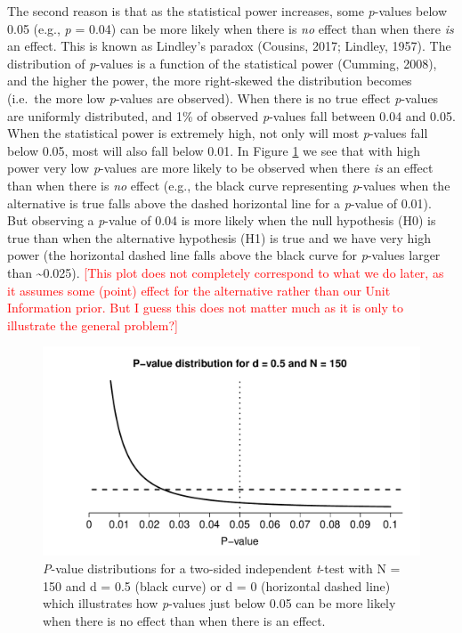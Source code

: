 \documentclass[
  english,
  ,jou, a4paper,floatsintext]{apa6}
\begin{document}
The second reason is that as the statistical power increases, some \emph{p}-values below 0.05 (e.g., \emph{p} = 0.04) can be more likely when there is \emph{no} effect than when there \emph{is} an effect. This is known as Lindley's paradox (Cousins, 2017; Lindley, 1957). The distribution of \emph{p}-values is a function of the statistical power (Cumming, 2008), and the higher the power, the more right-skewed the distribution becomes (i.e.~the more low \emph{p}-values are observed). When there is no true effect \emph{p}-values are uniformly distributed, and 1\% of observed \emph{p}-values fall between 0.04 and 0.05. When the statistical power is extremely high, not only will most \emph{p}-values fall below 0.05, most will also fall below 0.01. In Figure \ref{fig:p-plot} we see that with high power very low \emph{p}-values are more likely to be observed when there \emph{is} an effect than when there is \emph{no} effect (e.g., the black curve representing \emph{p}-values when the alternative is true falls above the dashed horizontal line for a \emph{p}-value of 0.01). But observing a \emph{p}-value of 0.04 is more likely when the null hypothesis (H0) is true than when the alternative hypothesis (H1) is true and we have very high power (the horizontal dashed line falls above the black curve for \emph{p}-values larger than \textasciitilde0.025).
\textcolor{red}{[This plot does not completely correspond to what we do later, as it assumes some (point) effect for the alternative rather than our Unit Information prior. But I guess this does not matter much as it is only to illustrate the general problem?]}

\begin{figure}
\centering
\includegraphics{Justify_in_Practice_files/figure-latex/p-plot-1.pdf}
\caption{\label{fig:p-plot}\emph{P}-value distributions for a two-sided independent \emph{t}-test with N = 150 and d = 0.5 (black curve) or d = 0 (horizontal dashed line) which illustrates how \emph{p}-values just below 0.05 can be more likely when there is no effect than when there is an effect.}
\end{figure}
\end{document}

